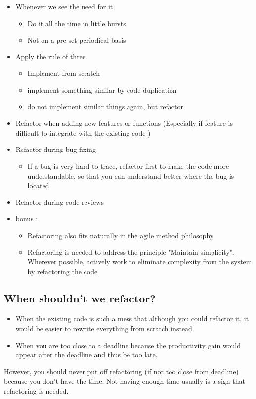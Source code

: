 \begin{itemize}
\item Whenever we see the need for it
\begin{itemize}
\item Do it all the time in little bursts
\item Not on a pre-set periodical basis
\end{itemize}
\item Apply the rule of three
\begin{itemize}
\item Implement from scratch
\item implement something similar by code duplication
\item do not implement similar things again, but refactor
\end{itemize}
\item Refactor when adding new features or functions (Especially if  feature is difficult to integrate with the existing 
code )
\item Refactor during bug fixing 
\begin{itemize}
\item If  a bug is very hard to trace, refactor first to make the code more understandable, so that you can understand better 
where the bug is located
\end{itemize}
\item Refactor during code reviews
\item bonus :\\
\begin{itemize}
\item Refactoring also fits naturally in the agile method philosophy 
\item Refactoring is needed to address the principle "Maintain 
simplicity". Wherever possible, actively work to eliminate complexity from the system by refactoring the code
\end{itemize}
\end{itemize}

\subsection{When shouldn't we refactor?}
\begin{itemize}
\item When the existing code is such a mess that although you could refactor it, it would be easier to rewrite everything from scratch instead. 
\item When you are too close to a deadline because the productivity gain would appear after the deadline and thus be too late. 
\end{itemize}
However, you should never put off refactoring (if not too close from deadline) because you don’t have the time. Not having enough time usually is a sign that refactoring is needed.

